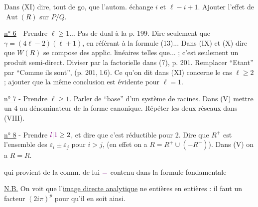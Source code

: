 Dans (XI) dire, tout de go, que l'autom. échange $i$ et $\ell-i+1$. Ajouter l'effet de $\operatorname{Aut}(R)$ sur $P/Q$.

\uline{n° 6} - Prendre $\ell\geq1$... Pas de dual à la p. 199. Dire seulement que $\gamma=(4\ell-2)(\ell+1)$, en référant à la formule (13)...
Dans (IX) et (X) dire que $W(R)$ se compose des applic. linéaires telles que... ; c'est seulement un produit semi-direct. Diviser par la factorielle dans (7), p. 201. Remplacer ``Etant'' par ``Comme ils sont'', (p. 201, l.6). Ce qu'on dit dans (XI) concerne le cas $\ell\geq2$ ; ajouter que la même conclusion est évidente pour $\ell=1$.

\uline{n° 7} - Prendre $\ell\geq1$. Parler de ``base'' d'un système de racines. Dans (V) mettre un 4 au dénominateur de la forme canonique. Répéter les deux réseaux dans (VIII).

\margin{--}

\uline{n° 8} - Prendre $\unsure{l|1}\geq2$, et dire que c'est réductible pour 2. Dire que $R^+$ est l'ensemble des $\varepsilon_i\pm\varepsilon_j$ pour $i>j$, (en effet on a $R=R^+\cup(-R^+)$). Dans (V) on a $R=R$.



qui provient de la comm. de
lui $\unsure{=}$ contenu dans la formule fondamentale

\uline{N.B.} On voit que l'\uline{image directe analytique} ne \uline{}  entières en \uline{} entières : il faut un facteur $(2i\pi)^p$  pour qu'il en soit ainsi.

